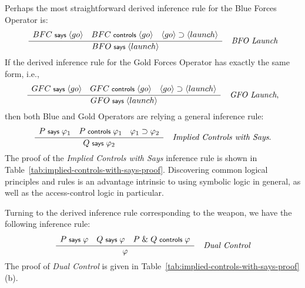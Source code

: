 \documentclass[10pt,twoside]{article}
\newcommand{\action}[1]{\ensuremath{\langle #1 \rangle}}
\renewcommand{\infname}[1]{\textit{#1}}
\renewcommand{\irule}[3]
    {\ensuremath{{\displaystyle \frac{#1}{#2}}\quad \infname{#3}}}
\begin{document}
Perhaps the most straightforward derived inference rule for the Blue
Forces Operator is:
\begin{gather*}
  \irule
  {
    \begin{array}{c}
      BFC \says \action{go} \quad BFC \controls \action{go}\quad
      \action{go} \implies \action{launch}\\
    \end{array}
  }
  {BFO \says \action{launch}}
  {BFO Launch}
\end{gather*}
If the derived inference rule for the Gold Forces Operator has exactly
the same form, i.e.,
\begin{gather*}
  \irule
  {
    \begin{array}{c}
      GFC \says \action{go} \quad GFC \controls \action{go}\quad
      \action{go} \implies \action{launch}\\
    \end{array}
  }
  {GFO \says \action{launch}}
  {GFO Launch},
\end{gather*}
then both Blue and Gold Operators are relying a general inference rule:
\begin{gather*}
  \irule
  {
    \begin{array}{c}
      P \says \varphi_1 \quad P \controls \varphi_1\quad
      \varphi_1 \implies \varphi_2\\
    \end{array}
  }
  {Q \says \varphi_2}
  {Implied Controls with Says}.
\end{gather*}
The proof of the \emph{Implied Controls with Says} inference rule is
shown in Table~\ref{tab:implied-controls-with-says-proof}.
Discovering common logical principles and rules is an advantage
intrinsic to using symbolic logic in general, as well as the
access-control logic in particular.

Turning to the derived inference rule corresponding to the weapon, we
have the following inference rule:
\begin{gather*}
  \irule
  {
    \begin{array}[h]{c}
      P \says \varphi \quad Q \says \varphi \quad P \with Q \controls \varphi
    \end{array}
  }
  {\varphi}
  {Dual Control}
\end{gather*}
The proof of \emph{Dual Control} is given in
Table~\ref{tab:implied-controls-with-says-proof}(b).
\end{document}

